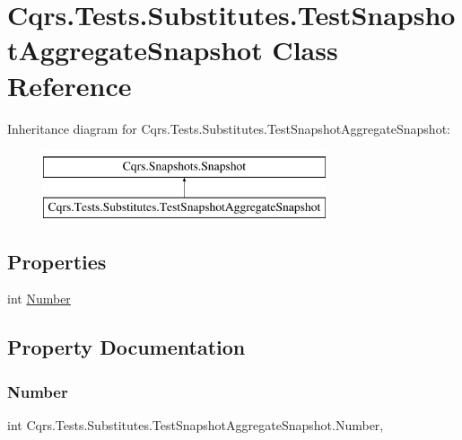 \hypertarget{classCqrs_1_1Tests_1_1Substitutes_1_1TestSnapshotAggregateSnapshot}{}\section{Cqrs.\+Tests.\+Substitutes.\+Test\+Snapshot\+Aggregate\+Snapshot Class Reference}
\label{classCqrs_1_1Tests_1_1Substitutes_1_1TestSnapshotAggregateSnapshot}
Inheritance diagram for Cqrs.\+Tests.\+Substitutes.\+Test\+Snapshot\+Aggregate\+Snapshot\+:\begin{figure}[H]
\begin{center}
\leavevmode
\includegraphics[height=2.000000cm]{classCqrs_1_1Tests_1_1Substitutes_1_1TestSnapshotAggregateSnapshot}
\end{center}
\end{figure}
\subsection*{Properties}
\begin{DoxyCompactItemize}
\item 
int \hyperlink{classCqrs_1_1Tests_1_1Substitutes_1_1TestSnapshotAggregateSnapshot_a0f27b6f734529ba45b4b04694ac2f65d}{Number}
\end{DoxyCompactItemize}


\subsection{Property Documentation}
\mbox{\label{classCqrs_1_1Tests_1_1Substitutes_1_1TestSnapshotAggregateSnapshot_a0f27b6f734529ba45b4b04694ac2f65d}} 
\subsubsection{\texorpdfstring{Number}{Number}}
{\footnotesize\ttfamily int Cqrs.\+Tests.\+Substitutes.\+Test\+Snapshot\+Aggregate\+Snapshot.\+Number\hspace{0.3cm}{\ttfamily [get]}, {\ttfamily [set]}}

